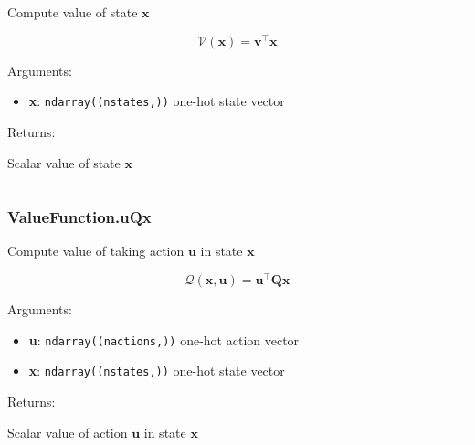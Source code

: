 \begin{Shaded}
\begin{Highlighting}[]
\end{Highlighting}
\end{Shaded}

Compute value of state \(\mathbf x\)

\[
\mathcal V(\mathbf x) = \mathbf v^\top \mathbf x
\]

Arguments:

\begin{itemize}
\tightlist
\item
  \textbf{x}: \texttt{ndarray((nstates,))} one-hot state vector
\end{itemize}

Returns:

Scalar value of state \(\mathbf x\)

\begin{center}\rule{0.5\linewidth}{\linethickness}\end{center}

\hypertarget{valuefunction.uqx}{%
\subsubsection{ValueFunction.uQx}\label{valuefunction.uqx}}

\begin{Shaded}
\begin{Highlighting}[]
\end{Highlighting}
\end{Shaded}

Compute value of taking action \(\mathbf u\) in state \(\mathbf x\)

\[
\mathcal Q(\mathbf x, \mathbf u) = \mathbf u^\top \mathbf Q \mathbf x
\]

Arguments:

\begin{itemize}
\tightlist
\item
  \textbf{u}: \texttt{ndarray((nactions,))} one-hot action vector
\item
  \textbf{x}: \texttt{ndarray((nstates,))} one-hot state vector
\end{itemize}

Returns:

Scalar value of action \(\mathbf u\) in state \(\mathbf x\)

